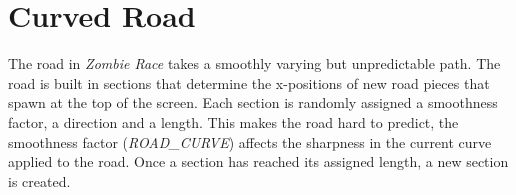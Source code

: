 \documentclass{article}
\begin{document}
\clearpage

\section{Curved Road}
The road in \emph{Zombie Race} takes a smoothly varying but unpredictable path. The road is built in sections that determine the x-positions of new road pieces that spawn at the top of  the screen. Each section is randomly assigned a smoothness factor, a direction and a length. This makes the road hard to predict, the smoothness factor (\emph{ROAD\_CURVE}) affects the sharpness in the current curve applied to the road. Once a section has reached its assigned length, a new section is created. 
\end{document}

